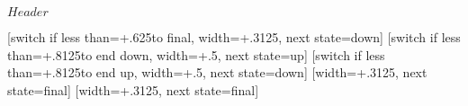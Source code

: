 %
%
%

\ProvidesFileRCS[v\pgfversion] $Header$


\newdimen\pgfsnakesegmentamplitude
\newdimen\pgfsnakesegmentlength
\def\pgfsnakesegmentangle{45}
\def\pgfsnakesegmentobjectlength{\pgfsnakesegmentamplitude}
\def\pgfsnakesegmentaspect{0.5}

\pgfsnakesegmentlength=10pt
\pgfsnakesegmentamplitude=2.5pt



%
%

{
  [switch if less than=+.625\pgfsnakesegmentlength to final,
                  width=+.3125\pgfsnakesegmentlength,
                  next state=down]
  { 
    \pgfpathcurveto
    {\pgfqpoint{.125\pgfsnakesegmentlength}{0pt}}
    {\pgfqpoint{.1875\pgfsnakesegmentlength}{\pgfsnakesegmentamplitude}}
    {\pgfqpoint{.3125\pgfsnakesegmentlength}{\pgfsnakesegmentamplitude}}
  }
  [switch if less than=+.8125\pgfsnakesegmentlength to end down,
               width=+.5\pgfsnakesegmentlength,
               next state=up]
  {
    \pgfpathcosine{\pgfqpoint{.25\pgfsnakesegmentlength}{-1\pgfsnakesegmentamplitude}}
    \pgfpathsine{\pgfqpoint{.25\pgfsnakesegmentlength}{-1\pgfsnakesegmentamplitude}}
  }               
  [switch if less than=+.8125\pgfsnakesegmentlength to end up,
             width=+.5\pgfsnakesegmentlength,
             next state=down]
  {
    \pgfpathcosine{\pgfqpoint{.25\pgfsnakesegmentlength}{\pgfsnakesegmentamplitude}}
    \pgfpathsine{\pgfqpoint{.25\pgfsnakesegmentlength}{\pgfsnakesegmentamplitude}}
  }               
  [width=+.3125\pgfsnakesegmentlength,
                   next state=final]
  {
    \pgfpathcurveto
    {\pgfqpoint{.125\pgfsnakesegmentlength}{\pgfsnakesegmentamplitude}}
    {\pgfqpoint{.1875\pgfsnakesegmentlength}{0pt}}
    {\pgfqpoint{.3125\pgfsnakesegmentlength}{0pt}}
  }  
  [width=+.3125\pgfsnakesegmentlength,
                 next state=final]
  {
    \pgfpathcurveto
    {\pgfqpoint{.125\pgfsnakesegmentlength}{-\pgfsnakesegmentamplitude}}
    {\pgfqpoint{.1875\pgfsnakesegmentlength}{0pt}}
    {\pgfqpoint{.3125\pgfsnakesegmentlength}{0pt}}
  }  
  { \pgfpathlineto{\pgfqpoint{\pgfsnakeremainingdistance}{0pt}} }
}




